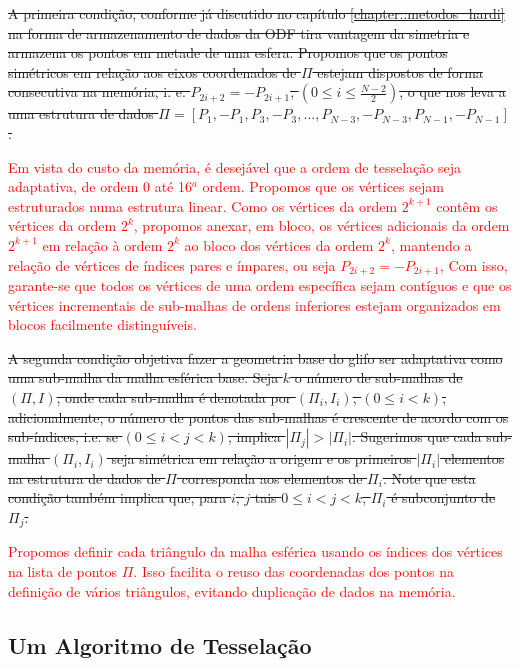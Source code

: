 \sout{
A primeira condição, conforme já discutido no capítulo \ref{chapter::metodos_hardi} na forma de armazenamento de dados da ODF tira vantagem da simetria e armazena os pontos em metade de uma esfera. Propomos que os pontos simétricos em relação aos eixos coordenados de $\Pi$ estejam dispostos de forma consecutiva na memória, i. e. $P_{2i+2} = -P_{2i+1}$, $(0 \leq i \leq \frac{N-2}{2})$, o que nos leva a uma estrutura de dados $\Pi = [P_1, -P_1, P_3, -P_3, \dots, P_{N-3}, -P_{N-3}, P_{N-1}, -P_{N-1}]$.
}

\textcolor{red}{Em vista do custo da memória, é desejável que a ordem de tesselação seja adaptativa, de ordem 0 até 16$^a$ ordem. Propomos que os vértices sejam estruturados numa estrutura linear. Como os vértices da ordem $2^{k+1}$ contêm os vértices da ordem $2^{k}$, propomos anexar, em bloco, os vértices adicionais da ordem $2^{k+1}$ em relação à ordem $2^k$ ao bloco dos vértices da ordem $2^k$, mantendo a relação de vértices de índices pares e ímpares, ou seja $P_{2i+2} = -P_{2i+1}$, Com isso, garante-se que todos os vértices de uma ordem específica sejam contíguos e que os vértices incrementais de sub-malhas de ordens inferiores estejam organizados em blocos facilmente distinguíveis.}

\sout{A segunda condição objetiva fazer a geometria base do glifo ser adaptativa como uma sub-malha da malha esférica base. Seja $k$ o número de sub-malhas de $(\Pi, I)$, onde cada sub-malha é denotada por $(\Pi_i, I_i)$,  $(0 \leq i < k)$, adicionalmente, o número de pontos das sub-malhas é crescente de acordo com os sub-índices, i.e. se $(0 \leq i < j < k)$, implica $|\Pi_j| > |\Pi_i|$. Sugerimos que cada sub-malha $(\Pi_i, I_i)$ seja simétrica em relação a origem e os primeiros $|\Pi_i|$ elementos na estrutura de dados de $\Pi$ corresponda aos elementos de $\Pi_i$. Note que esta condição também implica que, para $i$, $j$ tais $0 \leq i < j < k$, $\Pi_i$ é subconjunto de $\Pi_j$.}

\textcolor{red}{Propomos definir cada triângulo da malha esférica usando os índices dos vértices na lista de pontos $\Pi$. Isso facilita o reuso das coordenadas dos pontos na definição de vários triângulos, evitando duplicação de dados na memória.}

\subsection{Um Algoritmo de Tesselação}
\label{sssec::formulação_da_geometria_e_estruturação_de_dados}

